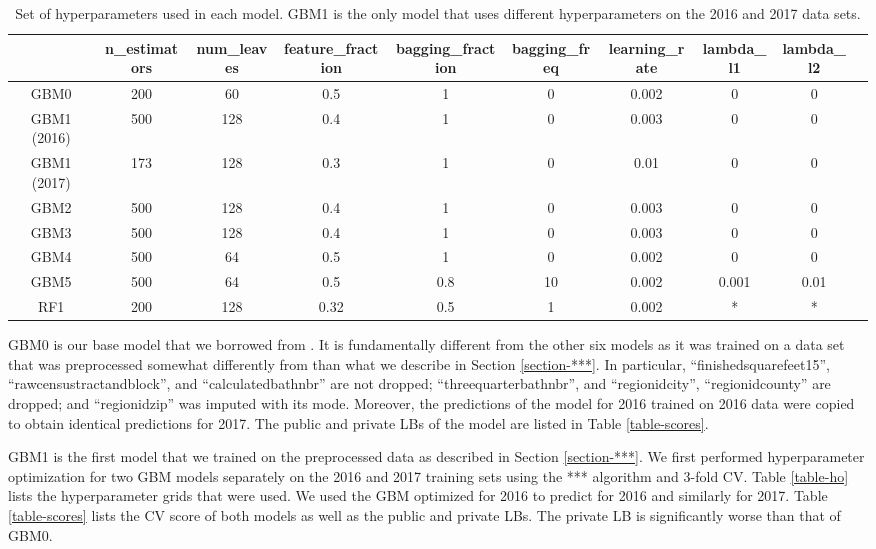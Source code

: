\documentclass[12pt]{article}
\begin{document}
\begin{table}
\centering
\caption{\label{table-params} Set of hyperparameters used in each model. GBM1 is the only model that uses different hyperparameters on the 2016 and 2017 data sets.}
\begin{tabular}{|c|c|c|c|c|c|c|c|c|c|} \hline
\quad & n_estimators & num_leaves & feature_fraction & bagging_fraction & bagging_freq & learning_rate & lambda_l1 & lambda_l2 \\ \hline
GBM0 & 200 & 60 & 0.5 & 1 & 0 & 0.002 & 0 & 0 \\
GBM1 (2016) & 500 & 128 & 0.4 & 1 & 0 & 0.003 & 0 & 0 \\
GBM1 (2017) & 173 & 128 & 0.3 & 1 & 0 & 0.01 & 0 & 0 \\
GBM2 & 500 & 128 & 0.4 & 1 & 0 & 0.003 & 0 & 0 \\
GBM3 & 500 & 128 & 0.4 & 1 & 0 & 0.003 & 0 & 0 \\
GBM4 & 500 & 64 & 0.5 & 1 & 0 & 0.002 & 0 & 0 \\
GBM5 & 500 & 64 & 0.5 & 0.8 & 10 & 0.002 & 0.001 & 0.01 \\
RF1 & 200 & 128 & 0.32 & 0.5 & 1 & 0.002 & * & * \\
\hline
\end{tabular}
\end{table}

GBM0 is our base model that we borrowed from \cite{rtlatimer}. It is fundamentally different from the other six models as it was trained on a data set that was preprocessed somewhat differently from than what we describe in Section \ref{section-***}. In particular, ``finishedsquarefeet15'', ``rawcensustractandblock'', and ``calculatedbathnbr'' are not dropped; ``threequarterbathnbr'', and ``regionidcity'', ``regionidcounty'' are dropped; and ``regionidzip'' was imputed with its mode. Moreover, the predictions of the model for 2016 trained on 2016 data were copied to obtain identical predictions for 2017. The public and private LBs of the model are listed in Table \ref{table-scores}.

GBM1 is the first model that we trained on the preprocessed data as described in Section \ref{section-***}. We first performed hyperparameter optimization for two GBM models separately on the 2016 and 2017 training sets using the *** algorithm and 3-fold CV. Table \ref{table-ho} lists the hyperparameter grids that were used. We used the GBM optimized for 2016 to predict for 2016 and similarly for 2017. Table \ref{table-scores} lists the CV score of both models as well as the public and private LBs. The private LB is significantly worse than that of GBM0.
\end{document}
